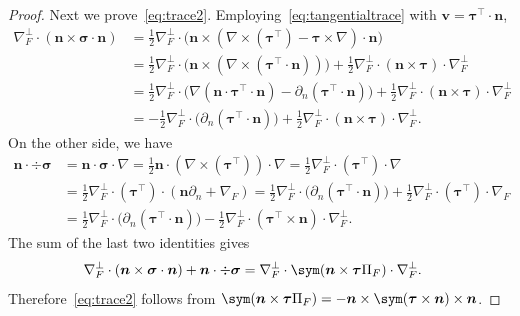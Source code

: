 \begin{proof}
Next we prove~\eqref{eq:trace2}. Employing~\eqref{eq:tangentialtrace} with $\boldsymbol v=\boldsymbol\tau^{\intercal}\cdot\boldsymbol n$,
\begin{align*}
\nabla_F^{\bot}\cdot(\boldsymbol n\times\boldsymbol \sigma\cdot\boldsymbol n) &=\frac{1}{2}\nabla_F^{\bot}\cdot\big(\boldsymbol n\times(\nabla\times(\boldsymbol\tau^{\intercal})-\boldsymbol\tau\times\nabla)\cdot\boldsymbol n\big) \\
 &=\frac{1}{2}\nabla_F^{\bot}\cdot\big(\boldsymbol n\times(\nabla\times(\boldsymbol\tau^{\intercal}\cdot\boldsymbol n))\big) + \frac{1}{2}\nabla_F^{\bot}\cdot(\boldsymbol n\times\boldsymbol\tau)\cdot\nabla_F^{\bot} \\
 &=\frac{1}{2}\nabla_F^{\bot}\cdot\big(\nabla(\boldsymbol n\cdot\boldsymbol\tau^{\intercal}\cdot\boldsymbol n) - \partial_n(\boldsymbol\tau^{\intercal}\cdot\boldsymbol n)\big) + \frac{1}{2}\nabla_F^{\bot}\cdot(\boldsymbol n\times\boldsymbol\tau)\cdot\nabla_F^{\bot} \\
 &=-\frac{1}{2}\nabla_F^{\bot}\cdot\big(\partial_n(\boldsymbol\tau^{\intercal}\cdot\boldsymbol n)\big) + \frac{1}{2}\nabla_F^{\bot}\cdot(\boldsymbol n\times\boldsymbol\tau)\cdot\nabla_F^{\bot}.
\end{align*}
On the other side, we have
\begin{align*}
\boldsymbol n\cdot \div\boldsymbol \sigma &=\boldsymbol  n\cdot\boldsymbol\sigma\cdot\nabla=\frac{1}{2}\boldsymbol n\cdot(\nabla\times(\boldsymbol\tau^{\intercal}))\cdot\nabla=\frac{1}{2}\nabla_F^{\bot}\cdot(\boldsymbol\tau^{\intercal})\cdot\nabla \\
&=\frac{1}{2}\nabla_F^{\bot}\cdot(\boldsymbol\tau^{\intercal})\cdot(\boldsymbol n\partial_n+\nabla_F)=\frac{1}{2}\nabla_F^{\bot}\cdot\big(\partial_n(\boldsymbol\tau^{\intercal}\cdot\boldsymbol n)\big) + \frac{1}{2}\nabla_F^{\bot}\cdot(\boldsymbol\tau^{\intercal})\cdot\nabla_F \\
&=\frac{1}{2}\nabla_F^{\bot}\cdot\big(\partial_n(\boldsymbol\tau^{\intercal}\cdot\boldsymbol n)\big) - \frac{1}{2}\nabla_F^{\bot}\cdot(\boldsymbol\tau^{\intercal}\times\boldsymbol n)\cdot\nabla_F^{\bot}.
\end{align*}
The sum of the last two identities gives
\begin{align*}
\nabla_F^{\bot}\cdot(\boldsymbol n\times\boldsymbol \sigma\cdot\boldsymbol n)+\boldsymbol  n\cdot \div\boldsymbol \sigma &=\nabla_F^{\bot}\cdot\sym(\boldsymbol n\times\boldsymbol\tau\Pi_F)\cdot\nabla_F^{\bot}.
\end{align*}
Therefore~\eqref{eq:trace2} follows from $\sym(\boldsymbol n\times\boldsymbol\tau\Pi_F)=-\boldsymbol  n\times \sym(\boldsymbol\tau\times\boldsymbol n)\times\boldsymbol n$.
\end{proof}

